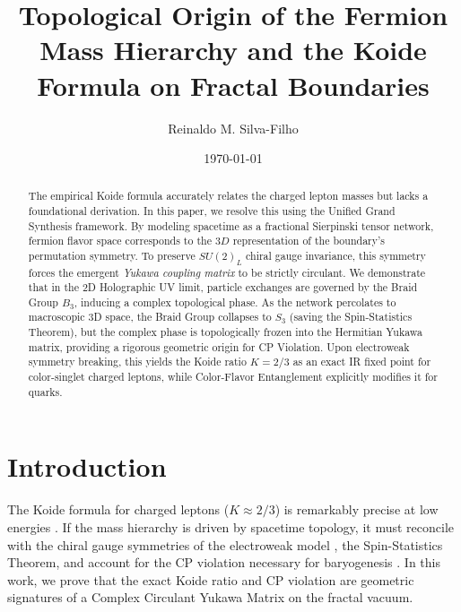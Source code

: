 \documentclass[11pt,a4paper]{amsart}
\theoremstyle{definition}
\begin{document}
\title[Topological Origin of the Fermion Mass Hierarchy]{Topological Origin of the Fermion Mass Hierarchy and the Koide Formula on Fractal Boundaries}

\author{Reinaldo M. Silva-Filho}
\address{Programa de P\'os-Gradua\c{c}\~ao em Estat\'istica e Experimenta\c{c}\~ao Agropecu\'aria (PPGEEAA/DES), Universidade Federal de Lavras (UFLA)}

\date{\today}

\begin{abstract}
The empirical Koide formula accurately relates the charged lepton masses but lacks a foundational derivation. In this paper, we resolve this using the Unified Grand Synthesis framework. By modeling spacetime as a fractional Sierpinski tensor network, fermion flavor space corresponds to the $3D$ representation of the boundary's permutation symmetry. To preserve $SU(2)_L$ chiral gauge invariance, this symmetry forces the emergent \emph{Yukawa coupling matrix} to be strictly circulant. We demonstrate that in the 2D Holographic UV limit, particle exchanges are governed by the Braid Group $B_3$, inducing a complex topological phase. As the network percolates to macroscopic 3D space, the Braid Group collapses to $S_3$ (saving the Spin-Statistics Theorem), but the complex phase is topologically frozen into the Hermitian Yukawa matrix, providing a rigorous geometric origin for CP Violation. Upon electroweak symmetry breaking, this yields the Koide ratio $K=2/3$ as an exact IR fixed point for color-singlet charged leptons, while Color-Flavor Entanglement explicitly modifies it for quarks.
\end{abstract}

\maketitle

\section{Introduction}
The Koide formula for charged leptons ($K \approx 2/3$) is remarkably precise at low energies \cite{koide1983fermion}. If the mass hierarchy is driven by spacetime topology, it must reconcile with the chiral gauge symmetries of the electroweak model \cite{weinberg1967model}, the Spin-Statistics Theorem, and account for the CP violation necessary for baryogenesis \cite{kobayashi1973cp}. In this work, we prove that the exact Koide ratio and CP violation are geometric signatures of a Complex Circulant Yukawa Matrix on the fractal vacuum.
\end{document}
